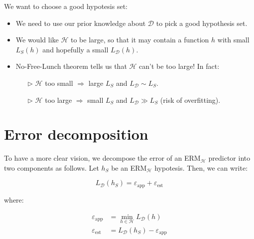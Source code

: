\documentclass[../../main/main.tex]{subfiles}
\begin{document}
\begin{remark}
    We want to choose a good hypotesis set:
    \begin{itemize}
        \item We need to use our prior knowledge about \( \mathcal{D} \) to pick a good hypothesis set.
        \item We would like \( \mathcal{H} \) to be large, so that it may contain a function \( h \) with small \( L_S(h) \) and hopefully a small \( L_{\mathcal{D}}(h) \).
        \item No-Free-Lunch theorem tells us that \( \mathcal{H} \) can't be too large! In fact:
        \begin{itemize}
            \item[$\triangleright$] \( \mathcal{H} \) too small \( \Longrightarrow \) large \( L_S \) and \( L_{\mathcal{D}} \sim L_S \).
            \item[$\triangleright$] \( \mathcal{H} \) too large \( \Longrightarrow \) small \( L_S \) and \( L_{\mathcal{D}} \gg L_S \) (risk of overfitting).
        \end{itemize}
    \end{itemize}
\end{remark}





\section{Error decomposition}
To have a more clear vision, we decompose the error of an ERM$_{\mathcal{H}}$ predictor into two components as follows. Let \( h_S \) be an ERM$_{\mathcal{H}}$ hypotesis. Then, we can write:

\begin{equation}
    L_{\mathcal{D}}(h_S) = \varepsilon_{\text{app}} + \varepsilon_{\text{est}}
    \label{eq:C4_ED}
\end{equation}

where:

\begin{subequations}
    \begin{align}
        \varepsilon_{\text{app}} &= \underset{h \in \mathcal{H}}{\min{}} L_{\mathcal{D}}(h) \label{eq:C4_EDAE}   \\
        \varepsilon_{\text{est}} &= L_{\mathcal{D}}(h_S) - \varepsilon_{\text{app}}         \label{eq:C4_EDEE}
    \end{align}
\end{subequations}
\end{document}
